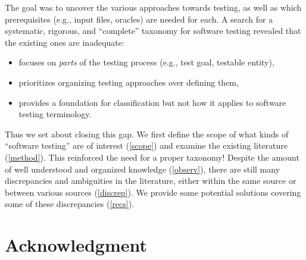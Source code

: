 \documentclass[conference]{IEEEtran}
\begin{document}
The goal was to uncover the various approaches towards testing, as well as
which prerequisites (e.g., input files, oracles) are needed for each.  A search
for a systematic, rigorous, and ``complete'' taxonomy for software testing
revealed that the existing ones are inadequate:

\begin{itemize}
    \item \cite{TebesEtAl2020a} focuses on \emph{parts} of the
          testing process (e.g., test goal, testable entity),
    \item \cite{SouzaEtAl2017} prioritizes organizing testing
          approaches over defining them,
    \item \cite{UnterkalmsteinerEtAl2014} provides a foundation for
          classification but not how it applies to software testing terminology.
\end{itemize}

Thus we set about closing this gap. We first define the scope of what kinds of
``software testing'' are of interest (\ref{scope}) and examine the existing
literature (\ref{method}). This reinforced the need for a proper taxonomy!
Despite the amount of well understood and organized knowledge (\ref{observ}),
there are still many discrepancies and ambiguities in the literature, either
within the same source or between various sources (\ref{discrep}). We provide
some potential solutions covering some of these discrepancies (\ref{recs}).







\section*{Acknowledgment}


\newpage



\end{document}
